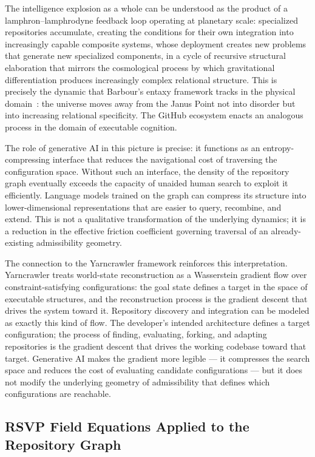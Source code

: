 \documentclass[11pt]{article}
\begin{document}
The intelligence explosion as a whole can be understood as the product of a
lamphron--lamphrodyne feedback loop operating at planetary scale: specialized
repositories accumulate, creating the conditions for their own integration into
increasingly capable composite systems, whose deployment creates new problems
that generate new specialized components, in a cycle of recursive structural
elaboration that mirrors the cosmological process by which gravitational
differentiation produces increasingly complex relational structure. This is
precisely the dynamic that Barbour's entaxy framework tracks in the physical
domain~\cite{barbour2020}: the universe moves away from the Janus Point not
into disorder but into increasing relational specificity. The GitHub ecosystem
enacts an analogous process in the domain of executable cognition.

The role of generative AI in this picture is precise: it functions as an
entropy-compressing interface that reduces the navigational cost of traversing
the configuration space. Without such an interface, the density of the repository
graph eventually exceeds the capacity of unaided human search to exploit it
efficiently. Language models trained on the graph can compress its structure into
lower-dimensional representations that are easier to query, recombine, and
extend. This is not a qualitative transformation of the underlying dynamics; it
is a reduction in the effective friction coefficient governing traversal of an
already-existing admissibility geometry.

The connection to the Yarncrawler framework reinforces this interpretation.
Yarncrawler treats world-state reconstruction as a Wasserstein gradient flow over
constraint-satisfying configurations: the goal state defines a target in the
space of executable structures, and the reconstruction process is the gradient
descent that drives the system toward it. Repository discovery and integration
can be modeled as exactly this kind of flow. The developer's intended
architecture defines a target configuration; the process of finding, evaluating,
forking, and adapting repositories is the gradient descent that drives the
working codebase toward that target. Generative AI makes the gradient more
legible --- it compresses the search space and reduces the cost of evaluating
candidate configurations --- but it does not modify the underlying geometry of
admissibility that defines which configurations are reachable.

\subsection*{RSVP Field Equations Applied to the Repository Graph}
\end{document}
